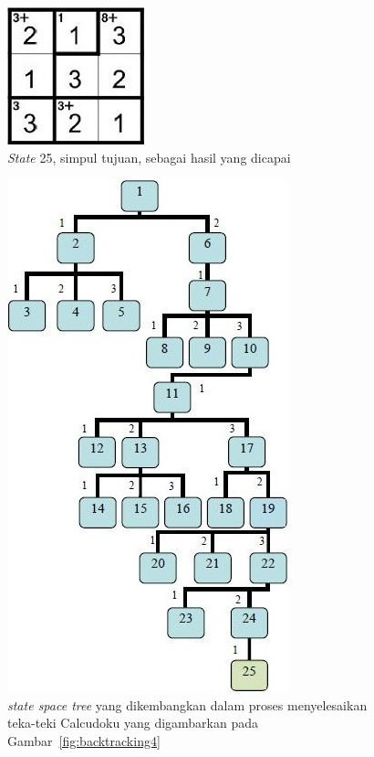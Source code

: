 \begin{enumerate}
\begin{figure}
\centering
\captionsetup{justification=centering}
\includegraphics[scale=1]{Gambar/Backtracking7}
\caption[\textit{State} 25, simpul tujuan, sebagai hasil yang dicapai  ~\cite{fahda:16:backtracking}]{\textit{State} 25, simpul tujuan, sebagai hasil yang dicapai  ~\cite{fahda:16:backtracking}}
\label{fig:backtracking7}
\end{figure}

\end{enumerate}

\begin{figure}
\centering
\captionsetup{justification=centering}
\includegraphics[scale=1]{Gambar/Backtracking8}
\caption[\textit{state space tree} yang dikembangkan dalam proses menyelesaikan teka-teki Calcudoku yang digambarkan pada  Gambar~\ref{fig:backtracking4}  ~\cite{fahda:16:backtracking}]{\textit{state space tree} yang dikembangkan dalam proses menyelesaikan teka-teki Calcudoku yang digambarkan pada  Gambar~\ref{fig:backtracking4}  ~\cite{fahda:16:backtracking}}
\label{fig:backtracking8}
\end{figure}

